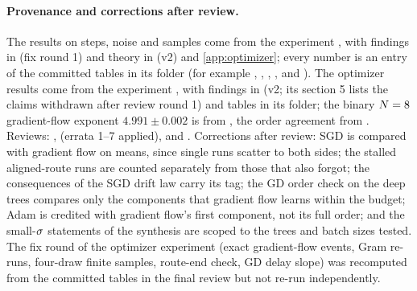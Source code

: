 \paragraph{Provenance and corrections after review.}
The results on steps, noise and samples come from the experiment , with findings in
 (fix round 1) and theory in  (v2) and
\cref{app:optimizer}; every number is an entry of the committed tables in its  folder (for example
, , , ,  and
). The optimizer results come from the experiment , with
findings in  (v2; its section 5 lists the claims withdrawn after review round 1) and tables
in its  folder; the binary $N=8$ gradient-flow exponent $4.991\pm0.002$ is from
, the order agreement from . Reviews:
,  (errata 1--7 applied),
 and . Corrections after review: SGD is compared with
gradient flow on means, since single runs scatter to both sides; the stalled aligned-route runs are counted
separately from those that also forgot; the consequences of the SGD drift law carry its \conjecture{} tag; the GD order
check on the deep trees compares only the components that gradient flow learns within the budget; Adam is credited
with gradient flow's first component, not its full order; and the small-$\sigma$ statements of the synthesis are
scoped to the trees and batch sizes tested. The fix round of the optimizer experiment (exact gradient-flow events,
Gram re-runs, four-draw finite samples, route-end check, GD delay slope) was recomputed from the committed tables in
the final review but not re-run independently.
